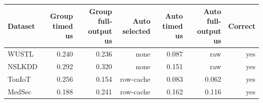 \begin{tabular}{lrrrrrr}
\toprule
Dataset & Group timed us & Group full-output us & Auto selected & Auto timed us & Auto full-output us & Correct \\
\midrule
WUSTL & 0.240 & 0.236 & none & 0.087 & raw & yes \\
NSLKDD & 0.292 & 0.320 & none & 0.151 & raw & yes \\
TonIoT & 0.256 & 0.154 & row-cache & 0.083 & 0.062 & yes \\
MedSec & 0.188 & 0.241 & row-cache & 0.162 & 0.116 & yes \\
\bottomrule
\end{tabular}
